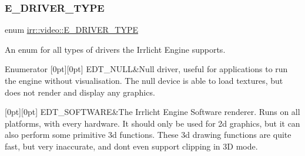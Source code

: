 \subsubsection{\texorpdfstring{E\+\_\+\+D\+R\+I\+V\+E\+R\+\_\+\+T\+Y\+PE}{E\_DRIVER\_TYPE}\hspace{0.1cm}{\footnotesize\ttfamily [2/3]}}
{\footnotesize\ttfamily enum \hyperlink{namespaceirr_1_1video_ae35a6de6d436c76107ad157fe42356d0}{irr\+::video\+::\+E\+\_\+\+D\+R\+I\+V\+E\+R\+\_\+\+T\+Y\+PE}}



An enum for all types of drivers the Irrlicht Engine supports. 

\begin{DoxyEnumFields}{Enumerator}
[0pt][0pt]{}\mbox{\label{namespaceirr_1_1video_ae35a6de6d436c76107ad157fe42356d0a847cc228389396d6228c00aadf461ecb}} 
E\+D\+T\+\_\+\+N\+U\+LL&Null driver, useful for applications to run the engine without visualisation. The null device is able to load textures, but does not render and display any graphics. \\
\hline

[0pt][0pt]{}\mbox{\label{namespaceirr_1_1video_ae35a6de6d436c76107ad157fe42356d0ad863d9225d42c1f9ea1eb7ad89a712ce}} 
E\+D\+T\+\_\+\+S\+O\+F\+T\+W\+A\+RE&The Irrlicht Engine Software renderer. Runs on all platforms, with every hardware. It should only be used for 2d graphics, but it can also perform some primitive 3d functions. These 3d drawing functions are quite fast, but very inaccurate, and don\textquotesingle{}t even support clipping in 3D mode. \\
\hline


\end{DoxyEnumFields}
